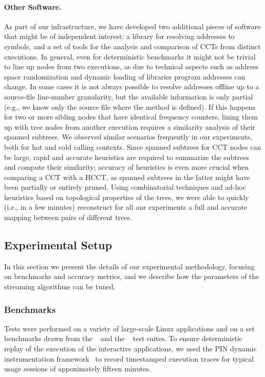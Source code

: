 \paragraph*{Other Software.} As part of our infrastructure, we have developed two additional pieces of software that might be of independent interest: a library for resolving addresses to symbols, and a set of tools for the analysis and comparison of CCTs from distinct executions. In general, even for deterministic benchmarks it might not be trivial to line up nodes from two executions, as due to technical aspects such as address space randomization and dynamic loading of libraries program addresses can change. In some cases it is not always possible to resolve addresses offline up to a source-file line-number granularity, but the available information is only partial (e.g., we know only the source file where the method is defined). If this happens for two or more sibling nodes that have identical frequency counters, lining them up with tree nodes from another execution requires a similarity analysis of their spanned subtrees. We observed similar scenarios frequently in our experiments, both for hot and cold calling contexts. Since spanned subtrees for CCT nodes can be large, rapid and accurate heuristics are required to summarize the subtrees and compute their similarity; accuracy of heuristics is even more crucial when comparing a CCT with a HCCT, as spanned subtrees in the latter might have been partially or entirely pruned. Using combinatorial techniques and ad-hoc heuristics based on topological properties of the trees, we were able to quickly (i.e., in a few minutes) reconstruct for all our experiments a full and accurate mapping between pairs of different trees.

\subsection{Experimental Setup}
\label{ss:hcct-experimental-setup}

In this section we present the details of our experimental methodology, focusing on benchmarks and accuracy metrics, and we describe how the parameters of the streaming algorithms can be tuned.

\subsubsection*{Benchmarks}
Tests were performed on a variety of large-scale Linux applications and on a set benchmarks drawn from the \phoronixpts~\cite{Henning06} and the \speccpu~\cite{Henning06} test suites. To ensure deterministic replay of the execution of the interactive applications, we used the PIN dynamic instrumentation framework~\cite{Luk05} to record timestamped execution traces for typical usage sessions of appoximately fifteen minutes.

